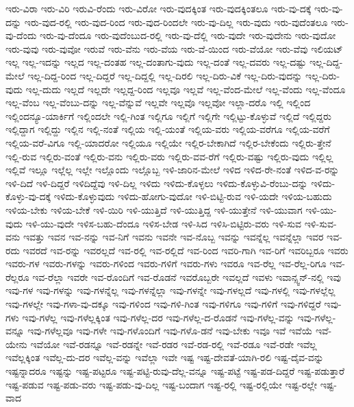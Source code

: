 {ಇರು-ವಿರಾ
ಇರು-ವಿರಿ
ಇರುವಿ-ರೆಂದು
ಇರು-ವಿರೋ
ಇರು-ವುದಕ್ಕಿಂತ
ಇರು-ವುದಕ್ಕಿಂತಲೂ
ಇರು-ವು-ದಕ್ಕೆ
ಇರು-ವು-ದನ್ನು
ಇರು-ವುದ-ರಲ್ಲಿ
ಇರು-ವುದ-ರಿಂದ
ಇರು-ವುದ-ರಿಂದಲೇ
ಇರು-ವು-ದಿಲ್ಲ
ಇರು-ವುದು
ಇರು-ವುದೆಂತಲೂ
ಇರು-ವು-ದೆಂದು
ಇರು-ವು-ದೆಂದೂ
ಇರು-ವುದೆಂಬುದ-ರಲ್ಲಿ
ಇರು-ವು-ದೆಲ್ಲಿ
ಇರು-ವುದೇ
ಇರು-ವುದೇನು
ಇರು-ವುದೋ
ಇರು-ವುವು
ಇರು-ವುವೋ
ಇರುವೆ
ಇರು-ವೆನು
ಇರು-ವೆಯ
ಇರು-ವೆ-ಯಿಂದ
ಇರು-ವೆಯೋ
ಇರು-ವೆವು
ಇಲಿಯಟ್
ಇಲ್ಲ
ಇಲ್ಲ-ಇದನ್ನು
ಇಲ್ಲದ
ಇಲ್ಲ-ದಂತಹ
ಇಲ್ಲ-ದಂತಾಗು-ವುದು
ಇಲ್ಲ-ದಂತೆ
ಇಲ್ಲ-ದವರು
ಇಲ್ಲ-ದಷ್ಟು
ಇಲ್ಲ-ದಿದ್ದ-ಮೇಲೆ
ಇಲ್ಲ-ದಿದ್ದ-ರಿಂದ
ಇಲ್ಲ-ದಿದ್ದರೆ
ಇಲ್ಲ-ದಿದ್ದಲ್ಲಿ
ಇಲ್ಲ-ದಿರಲಿ
ಇಲ್ಲ-ದಿರು-ವಿಕೆ
ಇಲ್ಲ-ದಿರು-ವುದನ್ನು
ಇಲ್ಲ-ದಿರು-ವುದು
ಇಲ್ಲ-ದುದು
ಇಲ್ಲದೆ
ಇಲ್ಲದೇ
ಇಲ್ಲದ್ದ-ರಿಂದ
ಇಲ್ಲವೂ
ಇಲ್ಲವೆ
ಇಲ್ಲ-ವೆಂದ-ಮೇಲೆ
ಇಲ್ಲ-ವೆಂದು
ಇಲ್ಲ-ವೆಂದೂ
ಇಲ್ಲ-ವೆಂಬ
ಇಲ್ಲ-ವೆಂಬು-ದನ್ನು
ಇಲ್ಲ-ವೆನ್ನುವೆ
ಇಲ್ಲವೇ
ಇಲ್ಲವೊ
ಇಲ್ಲವೋ
ಇಲ್ಲಾ-ದರೊ
ಇಲ್ಲಿ
ಇಲ್ಲಿಂದ
ಇಲ್ಲಿಂದನ್ಯೂ-ಯಾರ್ಕಿಗೆ
ಇಲ್ಲಿಂದಲೇ
ಇಲ್ಲಿ-ಗಿಂತ
ಇಲ್ಲಿಗೂ
ಇಲ್ಲಿಗೆ
ಇಲ್ಲಿಗೇ
ಇಲ್ಲಿಟ್ಟು-ಕೊಳ್ಳುವೆ
ಇಲ್ಲಿದೆ
ಇಲ್ಲಿದ್ದರು
ಇಲ್ಲಿದ್ದಾಗ
ಇಲ್ಲಿದ್ದು
ಇಲ್ಲಿನ
ಇಲ್ಲಿ-ನಂತೆ
ಇಲ್ಲಿಯ
ಇಲ್ಲಿ-ಯಂತೆ
ಇಲ್ಲಿಯ-ವರು
ಇಲ್ಲಿಯ-ವರೆಗೂ
ಇಲ್ಲಿಯ-ವರೆಗೆ
ಇಲ್ಲಿಯ-ವರೆ-ವಿಗೂ
ಇಲ್ಲಿ-ಯಾದರೋ
ಇಲ್ಲಿಯೂ
ಇಲ್ಲಿಯೇ
ಇಲ್ಲಿರ-ಬೇಕಾಗಿದೆ
ಇಲ್ಲಿರ-ಬೇಕೆಂದು
ಇಲ್ಲಿರು-ತ್ತೇನೆ
ಇಲ್ಲಿ-ರುವ
ಇಲ್ಲಿರು-ವಂತೆ
ಇಲ್ಲಿರು-ವನು
ಇಲ್ಲಿರು-ವರು
ಇಲ್ಲಿರು-ವವ-ರೆಗೆ
ಇಲ್ಲಿರು-ವಷ್ಟು
ಇಲ್ಲಿರು-ವುದು
ಇಲ್ಲಿಲ್ಲ
ಇಲ್ಲಿವೆ
ಇಲ್ಲೂ
ಇಲ್ಲೆಲ್ಲ
ಇಲ್ಲೇ
ಇಲ್ಲೊಂದು
ಇಲ್ಲೊಬ್ಬ
ಇಳಿ-ಜಾರಿನ-ಮೇಲೆ
ಇಳಿದ
ಇಳಿದ-ರೇ-ನಂತೆ
ಇಳಿದ-ವ-ರನ್ನು
ಇಳಿ-ದಿದೆ
ಇಳಿ-ದಿದ್ದರೆ
ಇಳಿದಿದ್ದೆವು
ಇಳಿ-ದಿಲ್ಲ
ಇಳಿದು
ಇಳಿದು-ಕೊಳ್ಳಲು
ಇಳಿದು-ಕೊಳ್ಳುವಿ-ರೆಂಬು-ದನ್ನು
ಇಳಿದು-ಕೊಳ್ಳು-ವು-ದಕ್ಕೆ
ಇಳಿದು-ಕೊಳ್ಳುವುದು
ಇಳಿದು-ಹೋಗು-ವುದೋ
ಇಳಿ-ಬಿಟ್ಟಿ-ರುವ
ಇಳಿ-ಯದೇ
ಇಳಿಯ-ಬಹುದು
ಇಳಿಯ-ಬೇಕು
ಇಳಿಯ-ಬೇಕೆ
ಇಳಿ-ಯಿರಿ
ಇಳಿ-ಯುತ್ತಿದೆ
ಇಳಿ-ಯುತ್ತಿದ್ದ
ಇಳಿ-ಯುತ್ತೇನೆ
ಇಳಿ-ಯುವಾಗ
ಇಳಿ-ಯು-ವುದು
ಇಳಿ-ಯು-ವುದೇ
ಇಳಿಸ-ಬಹು-ದೆಂದೂ
ಇಳಿಸ-ಬೇಡ
ಇಳಿ-ಸಿದ
ಇಳಿಸಿ-ಬಿಟ್ಟಿರು-ವರು
ಇಳಿ-ಸುವ
ಇಳಿ-ಸುವ-ವನು
ಇವತ್ತು
ಇವನ
ಇವ-ನನ್ನು
ಇವ-ನಿಗೆ
ಇವನು
ಇವನೇ
ಇವ-ನೊಬ್ಬ
ಇವನ್ನು
ಇವನ್ನೆಲ್ಲ
ಇವನ್ನೆಲ್ಲಾ
ಇವರ
ಇವ-ರದು
ಇವರದೆ
ಇವ-ರನ್ನು
ಇವರಲ್ಲದೆ
ಇವ-ರಲ್ಲಿ
ಇವ-ರಲ್ಲಿದೆ
ಇವ-ರಿಂದ
ಇವರಿ-ಗಾಗಿ
ಇವ-ರಿಗೆ
ಇವರಿಬ್ಬರೂ
ಇವರು
ಇವರು-ಗಳ
ಇವರು-ಗಳನ್ನು
ಇವರು-ಗಳಿಂದ
ಇವರು-ಗಳಿಗೆ
ಇವರು-ಗಳು
ಇವರೂ
ಇವ-ರೆಲ್ಲ
ಇವ-ರೆಲ್ಲ-ರಿಗೂ
ಇವ-ರೆಲ್ಲರೂ
ಇವ-ರೆಲ್ಲಾ
ಇವರೇ
ಇವ-ರೊಂದಿಗೆ
ಇವ-ರೊಡನೆ
ಇವರೊಬ್ಬರೇ
ಇವಲ್ಲದೆ
ಇವಳು
ಇವಾನ್ಸ್ವನ್-ನಲ್ಲಿ
ಇವು
ಇವು-ಗಳ
ಇವು-ಗಳನ್ನು
ಇವು-ಗಳನ್ನೆಲ್ಲ
ಇವು-ಗಳನ್ನೆಲ್ಲಾ
ಇವು-ಗಳನ್ನೇ
ಇವು-ಗಳಲ್ಲದೆ
ಇವು-ಗಳಲ್ಲಿ
ಇವು-ಗಳಲ್ಲೆಲ್ಲ
ಇವು-ಗಳಲ್ಲೇ
ಇವು-ಗಳಾ-ವು-ದಕ್ಕೂ
ಇವು-ಗಳಿಂದ
ಇವು-ಗಳಿ-ಗಿಂತ
ಇವು-ಗಳಿಗೂ
ಇವು-ಗಳಿಗೆ
ಇವು-ಗಳಿದ್ದರೆ
ಇವು-ಗಳು
ಇವು-ಗಳೆಲ್ಲ
ಇವು-ಗಳೆಲ್ಲಕ್ಕಿಂತ
ಇವು-ಗಳೆಲ್ಲ-ದರ
ಇವು-ಗಳೆಲ್ಲ-ದ-ರೊಡನೆ
ಇವು-ಗಳೆಲ್ಲ-ವನ್ನು
ಇವು-ಗಳೆಲ್ಲ-ವನ್ನೂ
ಇವು-ಗಳೆಲ್ಲವೂ
ಇವು-ಗಳೇ
ಇವು-ಗಳೊಂದಿಗೆ
ಇವು-ಗಳೊ-ಡನೆ
ಇವು-ಬೇಕು
ಇವೂ
ಇವೆ
ಇವೆಯೆ
ಇವೆ-ಯೇನು
ಇವೆಯೋ
ಇವೆ-ರಡನ್ನೂ
ಇವೆ-ರಡನ್ನೇ
ಇವೆ-ರಡರ
ಇವೆ-ರಡ-ರಲ್ಲಿ
ಇವೆ-ರಡೂ
ಇವೆ-ರಡೇ
ಇವೆಲ್ಲ
ಇವೆಲ್ಲಕ್ಕಿಂತ
ಇವೆಲ್ಲ-ದು-ದರ
ಇವೆಲ್ಲ-ವನ್ನು
ಇವೆಲ್ಲಾ
ಇವೇ
ಇಷ್ಟ
ಇಷ್ಟ-ದೇವತೆ-ಯಾಗಿ-ರಲಿ
ಇಷ್ಟ-ದೈವ-ವನ್ನು
ಇಷ್ಟನ್ನಾದರೂ
ಇಷ್ಟನ್ನು
ಇಷ್ಟ-ಪಟ್ಟರೂ
ಇಷ್ಟ-ಪಟ್ಟಿ-ರುವು-ದೆಲ್ಲ-ವನ್ನೂ
ಇಷ್ಟ-ಪಟ್ಟೆ
ಇಷ್ಟ-ಪಡ-ದಿದ್ದರೆ
ಇಷ್ಟ-ಪಡುತ್ತಾರೆ
ಇಷ್ಟ-ಪಡುವ
ಇಷ್ಟ-ಪಡು-ವರು
ಇಷ್ಟ-ಪಡು-ವು-ದಿಲ್ಲ
ಇಷ್ಟ-ಬಂದಾಗ
ಇಷ್ಟ-ರಲ್ಲಿ
ಇಷ್ಟ-ರಲ್ಲಿಯೇ
ಇಷ್ಟ-ರಲ್ಲೇ
ಇಷ್ಟ-ವಾದ
}
